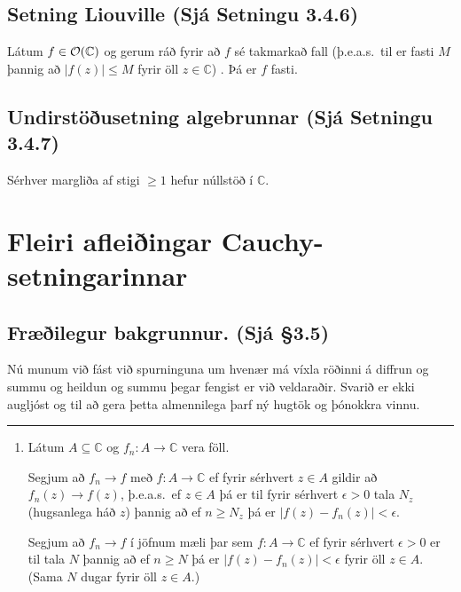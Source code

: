 \documentclass[a4paper,10pt,icelandic]{sphinxmanual}
\begin{document}
\subsection{Setning Liouville (Sjá Setningu 3.4.6)}
\label{\detokenize{Kafli03:setning-liouville-sja-setningu-3-4-6}}
Látum \(f\in {\cal O}({\mathbb{C}})\) og gerum ráð fyrir að \(f\) sé takmarkað fall (þ.e.a.s. til er fasti \(M\) þannig að \(|f(z)|\leq M\) fyrir öll \(z\in {\mathbb{C}}\)) . Þá er \(f\) fasti.


\subsection{Undirstöðusetning algebrunnar (Sjá Setningu 3.4.7)}
\label{\detokenize{Kafli03:undirstousetning-algebrunnar-sja-setningu-3-4-7}}
Sérhver margliða af stigi \(\geq 1\) hefur núllstöð í \({\mathbb{C}}\).


\section{Fleiri afleiðingar Cauchy-setningarinnar}
\label{\detokenize{Kafli03:fleiri-afleiingar-cauchy-setningarinnar}}

\subsection{Fræðilegur bakgrunnur. (Sjá \S{}3.5)}
\label{\detokenize{Kafli03:fraeilegur-bakgrunnur-sja-3-5}}
Nú munum við fást við spurninguna um hvenær má víxla röðinni á diffrun og summu og heildun og summu þegar fengist er við veldaraðir. Svarið er ekki augljóst og til að gera þetta almennilega þarf ný hugtök og þónokkra vinnu.


\bigskip\hrule\bigskip

\begin{enumerate}
%
\item {} 
Látum \(A\subseteq {\mathbb{C}}\) og \(f_n:A\rightarrow{\mathbb{C}}\) vera föll.

Segjum að \(f_n\rightarrow f\) með \(f:A\rightarrow{\mathbb{C}}\) ef fyrir sérhvert \(z\in A\) gildir að \(f_n(z)\rightarrow f(z)\), þ.e.a.s. ef \(z\in A\) þá er til fyrir sérhvert \(\epsilon>0\) tala \(N_z\) (hugsanlega háð \(z\)) þannig að ef \(n\geq N_z\) þá er \(|f(z)-f_n(z)|<\epsilon\).

Segjum að \(f_n\rightarrow f\) í jöfnum mæli þar sem \(f:A\rightarrow{\mathbb{C}}\) ef fyrir sérhvert \(\epsilon>0\) er til tala \(N\) þannig að ef \(n\geq N\) þá er \(|f(z)-f_n(z)|<\epsilon\) fyrir öll \(z\in A\). (Sama \(N\) dugar fyrir öll \(z\in A\).)

\end{enumerate}
\end{document}
